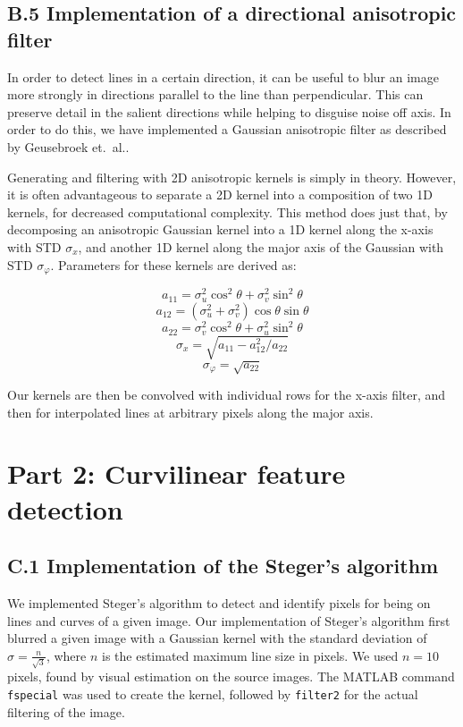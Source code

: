 \documentclass{article}
\begin{document}
\subsection*{B.5 Implementation of a directional anisotropic filter}

In order to detect lines in a certain direction, it can be useful to blur an image more strongly in directions parallel to the line than perpendicular. This can preserve detail in the salient directions while helping to disguise noise off axis. In order to do this, we have implemented a Gaussian anisotropic filter as described by Geusebroek et.\ al.\cite{geusebroek}.

Generating and filtering with 2D anisotropic kernels is simply in theory. However, it is often advantageous to separate a 2D kernel into a composition of two 1D kernels, for decreased computational complexity. This method does just that, by decomposing an anisotropic Gaussian kernel into a 1D kernel along the x-axis with STD $\sigma_x$, and another 1D kernel along the major axis of the Gaussian with STD $\sigma_\varphi$. Parameters for these kernels are derived as:

\[ a_{11} = \sigma_u^2 \cos^2 \theta + \sigma_v^2 \sin^2 \theta \]
\[ a_{12} = (\sigma_u^2 + \sigma_v^2)\cos\theta \sin\theta \]
\[ a_{22} = \sigma_v^2 \cos^2 \theta + \sigma_u^2 \sin^2 \theta \]
\[ \sigma_x = \sqrt{a_{11} - a_{12}^2/a_{22}} \]
\[ \sigma_\varphi = \sqrt{a_{22}} \]

Our kernels are then be convolved with individual rows for the x-axis filter, and then for interpolated lines at arbitrary pixels along the major axis.


\pagebreak
\section*{Part 2: Curvilinear feature detection}

\subsection*{C.1 Implementation of the Steger's algorithm}

We implemented Steger's algorithm to detect and identify pixels for being on lines and curves of a given image. Our implementation of Steger's algorithm first blurred a given image with a Gaussian kernel with the standard deviation of $\sigma = \frac{n}{\sqrt{3}}$, where $n$ is the estimated maximum line size in pixels. We used $n = 10$ pixels, found by visual estimation on the source images. The MATLAB command \texttt{fspecial} was used to create the kernel, followed by \texttt{filter2} for the actual filtering of the image.
\end{document}
